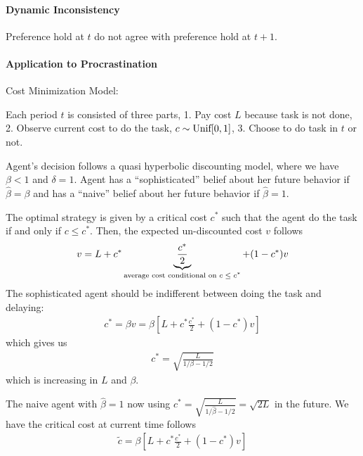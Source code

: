 \documentclass[11pt]{elegantbook}
\begin{document}
\paragraph*{Dynamic Inconsistency} Preference hold at $t$ do not agree with preference hold at $t+1$.


\paragraph*{Application to Procrastination}
Cost Minimization Model:

Each period $t$ is consisted of three parts, 1. Pay cost $L$ because task is not done, 2. Observe current cost to do the task, $c\sim \textnormal{Unif}[0,1]$, 3. Choose to do task in $t$ or not.

Agent's decision follows a quasi hyperbolic discounting model, where we have $\beta<1$ and $\delta=1$. Agent has a ``sophisticated'' belief about her future behavior if $\hat{\beta}=\beta$ and has a ``naive'' belief about her future behavior if $\hat{\beta}=1$.

The optimal strategy is given by a critical cost $c^*$ such that the agent do the task if and only if $c\leq c^*$. Then, the expected un-discounted cost $v$ follows
\begin{equation}
    \begin{aligned}
        v=L+c^*\underbrace{\frac{c^*}{2}}_\textnormal{average cost conditional on $c\leq c^*$}+(1-c^*)v
    \end{aligned}
    \nonumber
\end{equation}
The sophisticated agent should be indifferent between doing the task and delaying:
\begin{equation}
    \begin{aligned}
        c^*=\beta v = \beta[L+c^*\frac{c^*}{2}+(1-c^*)v]
    \end{aligned}
    \nonumber
\end{equation}
which gives us
\begin{equation}
    \begin{aligned}
        c^*=\sqrt{\frac{L}{1/\beta-1/2}}
    \end{aligned}
    \nonumber
\end{equation}
which is increasing in $L$ and $\beta$.

The naive agent with $\hat{\beta}=1$ now using $c^*=\sqrt{\frac{L}{1/\hat{\beta}-1/2}}=\sqrt{2L}$ in the future. We have the critical cost at current time follows
\begin{equation}
    \begin{aligned}
        \tilde{c}=\beta[L+c^*\frac{c^*}{2}+(1-c^*)v]
    \end{aligned}
    \nonumber
\end{equation}












\end{document}
